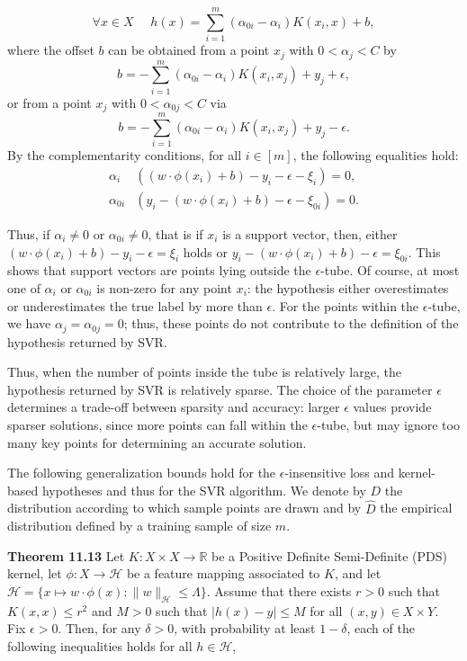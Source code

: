 \documentclass[fleqn,10pt]{olplainarticle}
\begin{document}
\[
\forall x \in X \ \ \ \ \ \ h(x) = \sum_{i=1}^{m} (\alpha_{0i} - \alpha_i) K(x_i, x) + b,
\]
where the offset $b$ can be obtained from a point $x_j$ with $0 < \alpha_j < C$ by
\[
b = -\sum_{i=1}^{m} (\alpha_{0i} - \alpha_i) K(x_i, x_j) + y_j + \epsilon,
\]
or from a point $x_j$ with $0 < \alpha_{0j} < C$ via
\[
b = -\sum_{i=1}^{m} (\alpha_{0i} - \alpha_i) K(x_i, x_j) + y_j - \epsilon.
\]
By the complementarity conditions, for all $i \in [m]$, the following equalities hold:
\[
\begin{aligned}
    \alpha_i &\left( (w \cdot \phi(x_i) + b) - y_i - \epsilon - \xi_i \right) = 0, \\
    \alpha_{0i} &\left( y_i - (w \cdot \phi(x_i) + b) - \epsilon - \xi_{0i} \right) = 0.
\end{aligned}
\]

Thus, if $\alpha_i \neq 0$ or $\alpha_{0i} \neq 0$, that is if $x_i$ is a support vector, then, either $(w \cdot \phi(x_i) + b) - y_i - \epsilon = \xi_i$ holds or $y_i - (w \cdot \phi(x_i) + b) - \epsilon = \xi_{0i}$. This shows that support vectors are points lying outside the $\epsilon$-tube. Of course, at most one of $\alpha_i$ or $\alpha_{0i}$ is non-zero for any point $x_i$: the hypothesis either overestimates or underestimates the true label by more than $\epsilon$. For the points within the $\epsilon$-tube, we have $\alpha_j = \alpha_{0j} = 0$; thus, these points do not contribute to the definition of the hypothesis returned by SVR.

Thus, when the number of points inside the tube is relatively large, the hypothesis returned by SVR is relatively sparse. The choice of the parameter $\epsilon$ determines a trade-off between sparsity and accuracy: larger $\epsilon$ values provide sparser solutions, since more points can fall within the $\epsilon$-tube, but may ignore too many key points for determining an accurate solution.

The following generalization bounds hold for the $\epsilon$-insensitive loss and kernel-based hypotheses and thus for the SVR algorithm. We denote by $D$ the distribution according to which sample points are drawn and by $\hat{D}$ the empirical distribution defined by a training sample of size $m$.

\textbf{Theorem 11.13} Let $K: X \times X \to \mathbb{R}$ be a Positive Definite Semi-Definite (PDS) kernel, let $\phi: X \to \mathcal{H}$ be a feature mapping associated to $K$, and let $\mathcal{H} = \{x \mapsto w \cdot \phi(x) : \|w\|_{\mathcal{H}} \leq \Lambda\}$. Assume that there exists $r > 0$ such that $K(x, x) \leq r^2$ and $M > 0$ such that $|h(x) - y| \leq M$ for all $(x, y) \in X \times Y$. Fix $\epsilon > 0$. Then, for any $\delta > 0$, with probability at least $1 - \delta$, each of the following inequalities holds for all $h \in \mathcal{H}$,
\end{document}
